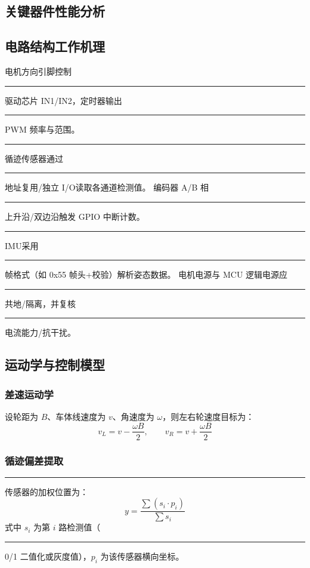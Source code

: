 \documentclass[12pt,a4paper,fontset=fandol]{ctexart}
\newcommand{\blank}{\rule{4cm}{0.4pt}}   %
\begin{document}
\subsection{关键器件性能分析}

\subsection{电路结构工作机理}
电机方向引脚控制\blank{驱动芯片 IN1/IN2}，定时器输出\blank{PWM 频率与范围}。
\blank{循迹传感器}通过\blank{地址复用/独立 I/O}读取各通道检测值。
编码器 A/B 相\blank{上升沿/双边沿}触发 GPIO 中断计数。
\blank{IMU}采用\blank{帧格式（如 0x55 帧头+校验）}解析姿态数据。
电机电源与 MCU 逻辑电源应\blank{共地/隔离}，并复核\blank{电流能力/抗干扰}。

\subsection{运动学与控制模型}

\subsubsection*{差速运动学}
设轮距为 $B$、车体线速度为 $v$、角速度为 $\omega$，则左右轮速度目标为：
\begin{equation}
  v_L = v - \frac{\omega B}{2}, \qquad v_R = v + \frac{\omega B}{2}
  \label{eq:kinematic}
\end{equation}

\subsubsection*{循迹偏差提取}
\blank{传感器}的加权位置为：
\begin{equation}
  y = \frac{\sum(s_i \cdot p_i)}{\sum s_i}
  \label{eq:weighted}
\end{equation}
式中 $s_i$ 为第 $i$ 路检测值（\blank{0/1 二值化或灰度值}），$p_i$ 为该传感器横向坐标。
\end{document}
